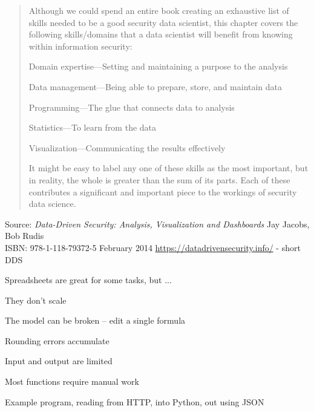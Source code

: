 \documentclass[Screen16to9,17pt]{foils}
\begin{document}
\begin{quote}
Although we could spend an entire book creating an exhaustive list of skills needed to be a good security data scientist, this chapter covers the following skills/domains that a data scientist will benefit from
knowing within information security:
\begin{list2}
\item Domain expertise—Setting and maintaining a purpose to the analysis
\item Data management—Being able to prepare, store, and maintain data
\item Programming—The glue that connects data to analysis
\item Statistics—To learn from the data
\item Visualization—Communicating the results effectively
\end{list2}
It might be easy to label any one of these skills as the most important, but in reality, the whole is greater than the sum of its parts. Each of these contributes a significant and important piece to the workings of
security data science.
\end{quote}

Source: \emph{Data-Driven Security: Analysis, Visualization and Dashboards} Jay Jacobs, Bob Rudis\\
ISBN: 978-1-118-79372-5 February 2014 \url{https://datadrivensecurity.info/} - short DDS





\begin{quote}

\end{quote}

\begin{list2}
\item Spreadsheets are great for some tasks, but ...
\item They don't scale
\item The model can be broken -- edit a single formula
\item Rounding errors accumulate
\item Input and output are limited
\item Most functions require manual work
\end{list2}


Example program, reading from HTTP, into Python, out using JSON
\inputminted{python}{programs/rest-1.py}
\end{document}
